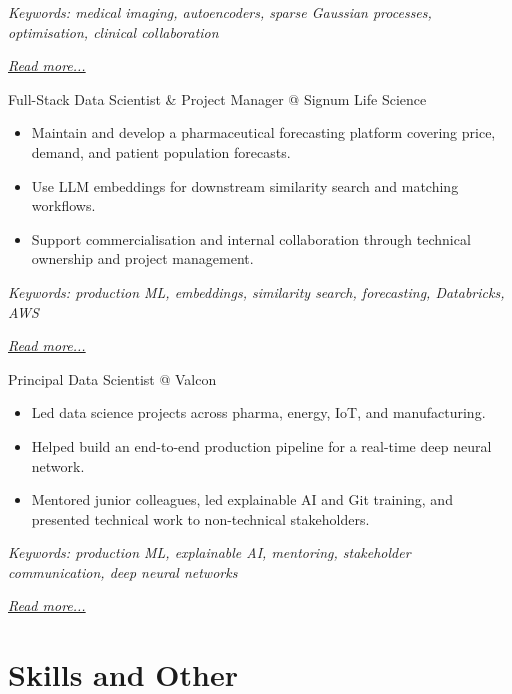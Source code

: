 \documentclass[11pt,a4paper]{moderncv}
\begin{document}
{\footnotesize\textit{Keywords: medical imaging, autoencoders, sparse Gaussian processes, optimisation, clinical collaboration}}

\hfill{\small{\textit{\hyperref[sec:raysearch]{Read more...}}}}

\large{Full-Stack Data Scientist \& Project Manager @ Signum Life Science}
\normalsize
\begin{itemize}
\item Maintain and develop a pharmaceutical forecasting platform covering price, demand, and patient population forecasts.
\item Use LLM embeddings for downstream similarity search and matching workflows.
\item Support commercialisation and internal collaboration through technical ownership and project management.
\end{itemize}

{\footnotesize\textit{Keywords: production ML, embeddings, similarity search, forecasting, Databricks, AWS}}

\hfill{\small{\textit{\hyperref[sec:signum]{Read more...}}}}

\large{Principal Data Scientist @ Valcon}
\normalsize
\begin{itemize}
\item Led data science projects across pharma, energy, IoT, and manufacturing.
\item Helped build an end-to-end production pipeline for a real-time deep neural network.
\item Mentored junior colleagues, led explainable AI and Git training, and presented technical work to non-technical stakeholders.
\end{itemize}

{\footnotesize\textit{Keywords: production ML, explainable AI, mentoring, stakeholder communication, deep neural networks}}

\hfill{\small{\textit{\hyperref[sec:valcon]{Read more...}}}}

\section{Skills and Other}
\normalsize
{}
\end{document}
